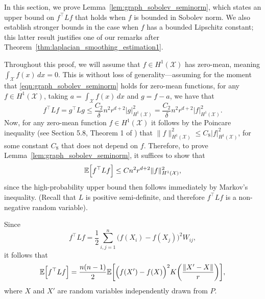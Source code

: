 \documentclass[twoside]{article}
\newcommand{\1}{\mathbf{1}}
\newcommand{\Xset}{\mathcal{X}}
\newcommand{\mc}[1]{\mathcal{#1}}
\newcommand{\Ebb}{\mathbb{E}}
\theoremstyle{definition}
\theoremstyle{remark}
\begin{document}
In this section, we prove Lemma~\ref{lem:graph_sobolev_seminorm}, which states an upper bound on $f^{\top} L f$ that holds when $f$ is bounded in Sobolev norm. We also establish stronger bounds in the case when $f$ has a bounded Lipschitz constant; this latter result justifies one of our remarks after Theorem~\ref{thm:laplacian_smoothing_estimation1}. 

Throughout this proof, we will assume that $f \in H^1(\Xset)$ has zero-mean, meaning $\int_{\Xset} f(x) \,dx = 0$. This is without loss of generality---assuming for the moment that \eqref{eqn:graph_sobolev_seminorm} holds for zero-mean functions, for any $f \in H^1(\Xset)$, taking $a = \int_{\Xset} f(x) \,dx$ and $g = f - a$, we have that
\begin{equation*}
f^{\top} L f = g^{\top} L g \leq \frac{C_2}{\delta} n^2 r^{d + 2} |g|_{H^1(\mc{X})}^2 = \frac{C_2}{\delta} n^2 r^{d + 2} |f|_{H^1(\mc{X})}^2.
\end{equation*} 
Now, for any zero-mean function $f \in H^1(\mc{X})$ it follows by the Poincare inequality (see Section 5.8, Theorem 1 of \citet{evans10}) that $\|f\|_{H^1(\mc{X})}^2 \leq C_8 |f|_{H^1(\mc{X})}^2$, for some constant $C_8$ that does not depend on $f$. Therefore, to prove Lemma~\ref{lem:graph_sobolev_seminorm}, it suffices to show that
\begin{equation*}
\Ebb\Bigl[f^{\top} L f\Bigr] \leq C n^2 r^{d + 2} \|f\|_{H^1(\Xset)}^2,
\end{equation*}
since the high-probability upper bound then follows immediately by Markov's inequality. (Recall that $L$ is positive semi-definite, and therefore $f^{\top} L f$ is a non-negative random variable).

Since
\begin{equation*}
f^{\top} L f = \frac{1}{2}\sum_{i, j = 1}^{n} \bigl(f(X_i) - f(X_j)\bigr)^2 W_{ij},
\end{equation*}
it follows that
\begin{equation}
\label{pf:first_order_graph_sobolev_seminorm_1}
\Ebb\Bigl[f^{\top} L f\Bigr] = \frac{n(n - 1)}{2} \Ebb\biggl[\Bigl(f(X') - f(X)\Bigr)^2 K\biggl(\frac{\|X' - X\|}{r}\biggr)\biggr],
\end{equation}
where $X$ and $X'$ are random variables independently drawn from $P$.
\end{document}
